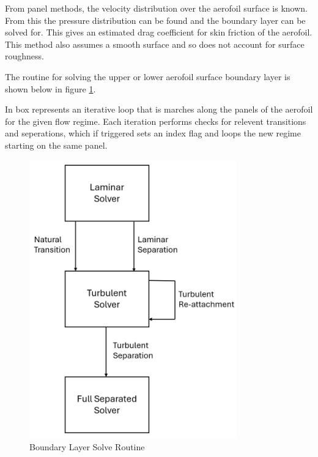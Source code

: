 \documentclass{article}
\begin{document}
\begin{minipage}{0.5\textwidth}

From panel methods, the velocity distribution over the aerofoil surface is known.
From this the pressure distribution can be found and the boundary layer can be solved for.
This gives an estimated drag coefficient for skin friction of the aerofoil.
This method also assumes a smooth surface and so does not account for surface roughness.

The routine for solving the upper or lower aerofoil surface boundary layer is shown below in figure \ref{fig:BL}.

In box represents an iterative loop that is marches along the panels of the aerofoil for the given flow regime.
Each iteration performs checks for relevent transitions and seperations,
which if triggered sets an index flag and loops the new regime starting on the same panel.
\end{minipage}
\begin{minipage}{0.5\textwidth}
    \begin{figure}[H]
        \centering
        \includegraphics[width=0.8\textwidth]{figures/BL_solver_flowchart.png}
        \caption{Boundary Layer Solve Routine}
        \label{fig:BL}
    \end{figure}
\end{minipage}
\end{document}
